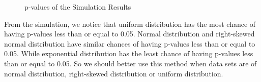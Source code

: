 \documentclass[12pt]{article}
\numberwithin{figure}{section}
\begin{document}
\begin{figure}[H]
    \centering
    \caption{p-values of the Simulation Results}
    \label{4.2}
\end{figure}

From the simulation, we notice that uniform distribution has the most chance of having p-values less than or equal to 0.05. Normal distribution and right-skewed normal distribution have similar chances of having p-values less than or equal to 0.05. While exponential distribution has the least chance of having p-values less than or equal to 0.05. So we should better use this method when data sets are of normal distribution, right-skewed distribution or uniform distribution.
\end{document}
